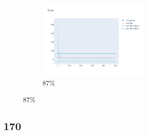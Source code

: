 \documentclass[12pt, fleqn]{report}                             %
\theoremstyle{break}                                            %
\begin{document}
\begin{figure}[ht!]
\begin{subfigure}[b]{0.4\linewidth}
          \includegraphics[width=0.6\textwidth]{Images/164/dia-d.png}
          \caption{87\%}
        \end{subfigure}
      \end{figure}


      \clearpage
      \subsection{170}
\end{document}
